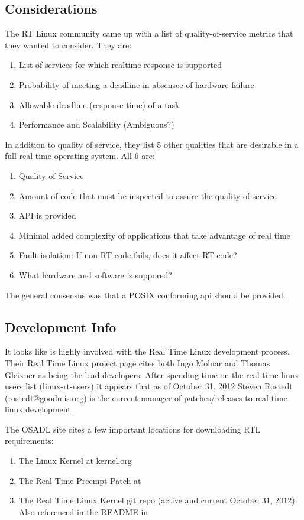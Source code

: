 \documentclass{article}
\begin{document}
\subsection{Considerations}
The RT Linux community came up with a list of quality-of-service metrics that they wanted to consider. \cite{RTLSummaryPost}  They are:
\begin{enumerate}
\item List of services for which realtime response is supported
\item Probability of meeting a deadline in absensce of hardware failure
\item Allowable deadline (response time) of a task
\item Performance and Scalability (Ambiguous?)
\end{enumerate}

In addition to quality of service, they list 5 other qualities that are desirable in a full real time operating system.  All 6 are:
\begin{enumerate}
\item Quality of Service
\item Amount of code that must be inspected to assure the quality of service
\item API is provided
\item Minimal added complexity of applications that take advantage of real time
\item Fault isolation: If non-RT code fails, does it affect RT code?
\item What hardware and software is suppored?
\end{enumerate}

The general consensus was that a POSIX conforming api should be provided.

\subsection{Development Info}
It looks like \cite{Osadl} is highly involved with the Real Time Linux development process.  Their Real Time Linux project page \cite{OsadlRealTimeLinux} cites both Ingo Molnar and Thomas Gleixner as being the lead developers.  After spending time on the real time linux users list (linux-rt-users) it appears that as of October 31, 2012 Steven Rostedt (rostedt@goodmis.org) is the current manager of patches/releases to real time linux development.

The OSADL site cites a few important locations for downloading RTL requirements:
\begin{enumerate}
\item The Linux Kernel at kernel.org
\item The Real Time Preempt Patch at \cite{RealTimeLinuxPatch}
\item The Real Time Linux Kernel git repo \cite{RealTimeLinuxGit} (active and current October 31, 2012).  Also referenced in the README in \cite{RealTimeLinuxPatch}
\end{enumerate}
\end{document}

